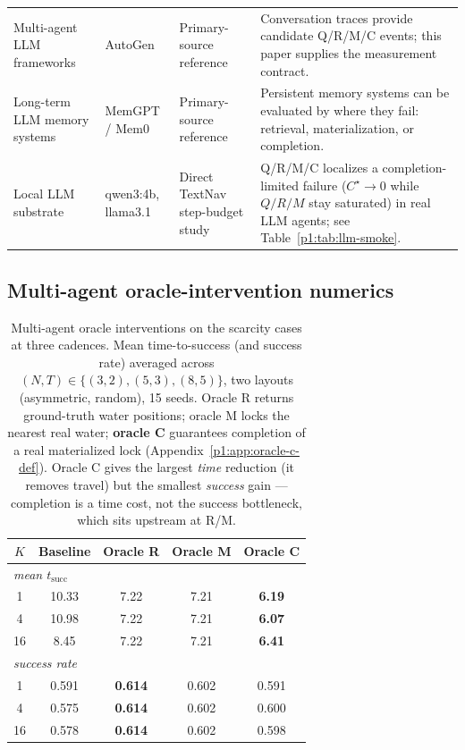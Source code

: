 \documentclass{article}
\begin{document}
\begin{table}[h]
\begin{tabular}{p{2.45cm}p{2.55cm}p{2.7cm}p{4.0cm}}
Multi-agent LLM frameworks & AutoGen \citep{wu2023autogen} & Primary-source reference & Conversation traces provide candidate Q/R/M/C events; this paper supplies the measurement contract. \\
Long-term LLM memory systems & MemGPT / Mem0 \citep{packer2023memgpt,chhikara2025mem0} & Primary-source reference & Persistent memory systems can be evaluated by where they fail: retrieval, materialization, or completion. \\
Local LLM substrate & qwen3:4b, llama3.1 & Direct TextNav step-budget study & Q/R/M/C localizes a completion-limited failure ($C^\star{\to}0$ while $Q/R/M$ stay saturated) in real LLM agents; see Table~\ref{p1:tab:llm-smoke}. \\
\bottomrule
\end{tabular}
\end{table}

\subsection{Multi-agent oracle-intervention numerics}
\label{p1:app:multi-oracle}

\begin{table}[h]
\caption{Multi-agent oracle interventions on the scarcity cases at three cadences. Mean time-to-success (and success rate) averaged across $(N,T)\in\{(3,2),(5,3),(8,5)\}$, two layouts (asymmetric, random), 15 seeds. Oracle R returns ground-truth water positions; oracle M locks the nearest real water; \textbf{oracle C} guarantees completion of a real materialized lock (Appendix~\ref{p1:app:oracle-c-def}). Oracle C gives the largest \emph{time} reduction (it removes travel) but the smallest \emph{success} gain --- completion is a time cost, not the success bottleneck, which sits upstream at R/M.}
\label{p1:tab:multi-agent-oracle}
\centering
\small
\begin{tabular}{c c c c c}
\toprule
$K$ & Baseline & Oracle R & Oracle M & Oracle C \\
\midrule
\multicolumn{5}{l}{\emph{mean $t_{\mathrm{succ}}$}}\\
1  & 10.33 & 7.22 & 7.21 & \textbf{6.19} \\
4  & 10.98 & 7.22 & 7.21 & \textbf{6.07} \\
16 &  8.45 & 7.22 & 7.21 & \textbf{6.41} \\
\midrule
\multicolumn{5}{l}{\emph{success rate}}\\
1  & 0.591 & \textbf{0.614} & 0.602 & 0.591 \\
4  & 0.575 & \textbf{0.614} & 0.602 & 0.600 \\
16 & 0.578 & \textbf{0.614} & 0.602 & 0.598 \\
\bottomrule
\end{tabular}
\end{table}
\end{document}

